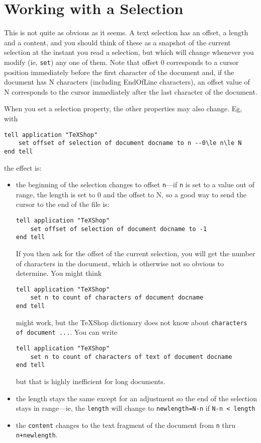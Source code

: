 \documentclass[11pt]{amsart}
\begin{document}
\section{Working with a Selection}
This is not quite as obvious as it seems. A text selection has an offset, a length and a content, and you should think of these as a snapshot of the current selection at the instant  you read a selection, but which will change whenever you modify (ie, {\tt set}) any one of them. Note that offset $0$ corresponds to a cursor position immediately before the first character of the document and, if the document has N characters (including EndOfLine characters), an offset value of N corresponds to the cursor immediately after the last character of the document. 

When you set a selection property, the other properties may also change. Eg, with
\begin{verbatim}
tell application "TeXShop"
    set offset of selection of document docname to n --0\le n\le N
end tell
\end{verbatim}
the effect is:
\begin{itemize}
\item
the beginning of the selection changes to offset {\tt n}---if {\tt n} is set to a value out of range, the length is set to $0$ and the offset to N, so a good way to send the cursor to the end of the file is: 
\begin{verbatim}
tell application "TeXShop"
    set offset of selection of document docname to -1
end tell
\end{verbatim}
If you then ask for the offset of the current selection, you will get the number of characters in the document, which is otherwise not so obvious to determine. You might think
\begin{verbatim}
tell application "TeXShop"
    set n to count of characters of document docname
end tell
\end{verbatim}
 might  work, but the \TeX Shop dictionary does not know about \verb|characters of document ...|. You can write
\begin{verbatim}
tell application "TeXShop"
    set n to count of characters of text of document docname
end tell
\end{verbatim}
but that is highly inefficient for long documents.
\item the length stays the same except for an adjustment so the end of the selection stays in range---ie, the {\tt length} will change to {\tt newlength=N-n} if \verb|N-n < length| 
\item  the {\tt content} changes to the text fragment of the document from {\tt n} thru {\tt n+newlength}.
\end{itemize}
\end{document}
